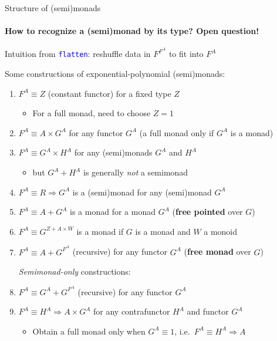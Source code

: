\documentclass[english]{beamer}
\begin{document}
\begin{frame}{Structure of (semi)monads}


\framesubtitle{How to recognize a (semi)monad by its type? Open question!}

Intuition from \texttt{\textcolor{blue}{\footnotesize{}flatten}}:
reshuffle data in $F^{F^{A}}$ to fit into $F^{A}$

Some constructions of exponential-polynomial (semi)monads:
\begin{enumerate}
\item $F^{A}\equiv Z$ (constant functor) for a fixed type $Z$
\begin{itemize}
\item For a full monad, need to choose $Z=1$ 
\end{itemize}
\item $F^{A}\equiv A\times G^{A}$ for any functor $G^{A}$ (a full monad
only if $G^{A}$ is a monad)
\item $F^{A}\equiv G^{A}\times H^{A}$ for any (semi)monads $G^{A}$ and
$H^{A}$
\begin{itemize}
\item but $G^{A}+H^{A}$ is generally \emph{not} a semimonad
\end{itemize}
\item $F^{A}\equiv R\Rightarrow G^{A}$ is a (semi)monad for any (semi)monad
$G^{A}$
\item $F^{A}\equiv A+G^{A}$ is a monad for a monad $G^{A}$ (\textbf{free
pointed} over $G$)
\item $F^{A}\equiv G^{Z+A\times W}$ is a monad if $G$ is a monad and $W$
a monoid
\item $F^{A}\equiv A+G^{F^{A}}$ (recursive) for any functor $G^{A}$ (\textbf{free
monad} over $G$)

\emph{Semimonad-only} constructions:
\item $F^{A}\equiv G^{A}+G^{F^{A}}$ (recursive) for any functor $G^{A}$
\item $F^{A}\equiv H^{A}\Rightarrow A\times G^{A}$ for any contrafunctor
$H^{A}$ and functor $G^{A}$
\begin{itemize}
\item Obtain a full monad only when $G^{A}\equiv1$, i.e.\ $F^{A}\equiv H^{A}\Rightarrow A$
\end{itemize}
\end{enumerate}
\end{frame}
\end{document}
